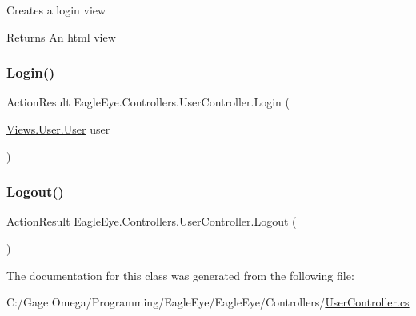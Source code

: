 Creates a login view 

\begin{DoxyReturn}{Returns}
An html view 
\end{DoxyReturn}
\mbox{\label{class_eagle_eye_1_1_controllers_1_1_user_controller_ad2199840c954a1a465e25087fee02564}} 
\subsubsection{\texorpdfstring{Login()}{Login()}}
{\footnotesize\ttfamily Action\+Result Eagle\+Eye.\+Controllers.\+User\+Controller.\+Login (\begin{DoxyParamCaption}\item[{\mbox{\hyperlink{class_eagle_eye_1_1_views_1_1_user_1_1_user}{Views.\+User.\+User}}}]{user }\end{DoxyParamCaption})}





\mbox{\label{class_eagle_eye_1_1_controllers_1_1_user_controller_a23b7abc37b240a70620675d09edecf8c}} 
\subsubsection{\texorpdfstring{Logout()}{Logout()}}
{\footnotesize\ttfamily Action\+Result Eagle\+Eye.\+Controllers.\+User\+Controller.\+Logout (\begin{DoxyParamCaption}{ }\end{DoxyParamCaption})}







The documentation for this class was generated from the following file\+:\begin{DoxyCompactItemize}
\item 
C\+:/\+Gage Omega/\+Programming/\+Eagle\+Eye/\+Eagle\+Eye/\+Controllers/\mbox{\hyperlink{_user_controller_8cs}{User\+Controller.\+cs}}\end{DoxyCompactItemize}
